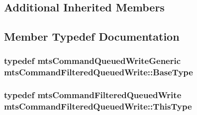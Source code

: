 \subsection*{Additional Inherited Members}


\subsection{Member Typedef Documentation}
\hypertarget{classmts_command_filtered_queued_write_af9539c71a0b5815f2206641041dfdd60}{
\subsubsection[{Base\-Type}]{\setlength{\rightskip}{0pt plus 5cm}typedef {\bf mts\-Command\-Queued\-Write\-Generic} {\bf mts\-Command\-Filtered\-Queued\-Write\-::\-Base\-Type}}}\label{classmts_command_filtered_queued_write_af9539c71a0b5815f2206641041dfdd60}
\hypertarget{classmts_command_filtered_queued_write_a155aa724cca736441779aaa34b7f5c6e}{
\subsubsection[{This\-Type}]{\setlength{\rightskip}{0pt plus 5cm}typedef {\bf mts\-Command\-Filtered\-Queued\-Write} {\bf mts\-Command\-Filtered\-Queued\-Write\-::\-This\-Type}}}\label{classmts_command_filtered_queued_write_a155aa724cca736441779aaa34b7f5c6e}



